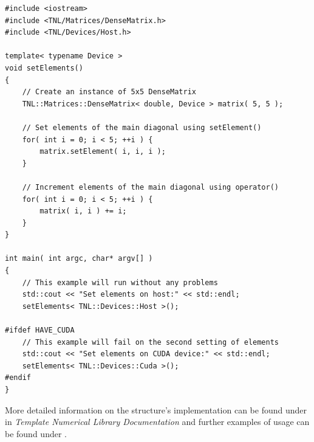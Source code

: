 \begin{lstlisting}[caption={Code example showing the use of \code{setElement()}, and \code{operator()}; \code{getElement()} and getting a matrix element using \code{operator()} would be done similarly. The example requires the TNL library to already be installed. As mentioned in the code, the \code{setElements()} function will run correctly when evoked using the \code{TNL::Devices::Host} template parameter. However, if the \code{DenseMatrix} instance is allocated on the device, then the first setting of elements (using \code{setElement()}) will be slow due to the data transfer between the host and the device - each call will mean a unique data transfer. Furthermore, the second setting of elements (using \code{operator()}) will fail as \code{operator()} will be called from a host function on a \code{DenseMatrix} instance allocated on the device. For the second setter to work, it would need to be called from within a kernel. Taken from section \code{Tutorials/Matrices/DenseMatrices} in the \emph{Template Numerical Library Documentation} \cite{Ednu6dyrkWKz1Bv2}.},label={Listing:implementation-dense-matrix-getters-setters}]
#include <iostream>
#include <TNL/Matrices/DenseMatrix.h>
#include <TNL/Devices/Host.h>

template< typename Device >
void setElements()
{
	// Create an instance of 5x5 DenseMatrix
	TNL::Matrices::DenseMatrix< double, Device > matrix( 5, 5 );
	
	// Set elements of the main diagonal using setElement()
	for( int i = 0; i < 5; ++i ) {
		matrix.setElement( i, i, i );
	}

	// Increment elements of the main diagonal using operator()
	for( int i = 0; i < 5; ++i ) {
		matrix( i, i ) += i;
	}
}

int main( int argc, char* argv[] )
{
	// This example will run without any problems
	std::cout << "Set elements on host:" << std::endl;
	setElements< TNL::Devices::Host >();
	
#ifdef HAVE_CUDA
	// This example will fail on the second setting of elements
	std::cout << "Set elements on CUDA device:" << std::endl;
	setElements< TNL::Devices::Cuda >();
#endif
}
\end{lstlisting}

More detailed information on the structure's implementation can be found under  in \emph{Template Numerical Library Documentation} \cite{Ednu6dyrkWKz1Bv2} and further examples of usage can be found under .



